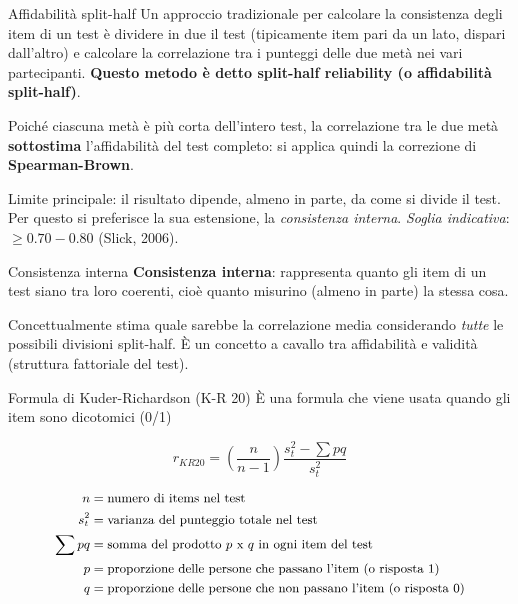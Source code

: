 \documentclass[
  ignorenonframetext,
  aspectratio=169,
]{beamer}
\begin{document}
\begin{frame}{Affidabilità split-half}
\label{affidabilituxe0-split-half}
Un approccio tradizionale per calcolare la consistenza degli item di un
test è dividere in due il test (tipicamente item pari da un lato,
dispari dall'altro) e calcolare la correlazione tra i punteggi delle due
metà nei vari partecipanti. \textbf{Questo metodo è detto split-half
reliability (o affidabilità split-half)}.

Poiché ciascuna metà è più corta dell'intero test, la correlazione tra
le due metà \textbf{sottostima} l'affidabilità del test completo: si
applica quindi la correzione di \textbf{Spearman-Brown}.

Limite principale: il risultato dipende, almeno in parte, da come si
divide il test. Per questo si preferisce la sua estensione, la
\emph{consistenza interna}. \emph{Soglia indicativa}:
\(\geq 0.70 - 0.80\) (Slick, 2006).
\end{frame}

\begin{frame}{Consistenza interna}
\label{consistenza-interna}
\textbf{Consistenza interna}: rappresenta quanto gli item di un test
siano tra loro coerenti, cioè quanto misurino (almeno in parte) la
stessa cosa.

Concettualmente stima quale sarebbe la correlazione media considerando
\emph{tutte} le possibili divisioni split-half. È un concetto a cavallo
tra affidabilità e validità (struttura fattoriale del test).
\end{frame}

\begin{frame}{Formula di Kuder-Richardson (K-R 20)}
\label{formula-di-kuder-richardson-k-r-20}
È una formula che viene usata quando gli item sono dicotomici (0/1)

\[
r_{KR20} = \left(\frac{n}{n-1}\right)\frac{s_t^2 - \sum{pq}}{s_t^2}
\]

\[
\small
\begin{aligned}
n & = \text{numero di items nel test} \\
s_t^2 & = \text{varianza del punteggio totale nel test} \\
\sum{pq} & = \text{somma del prodotto $p$ x $q$ in ogni item del test} \\
p & = \text{proporzione delle persone che passano l’item (o risposta 1)} \\
q & = \text{proporzione delle persone che non passano l’item (o risposta 0)}
\end{aligned}
\]
\end{frame}
\end{document}
